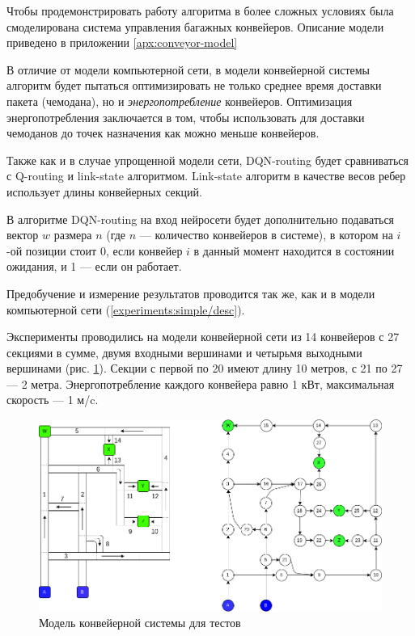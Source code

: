\documentclass[specification, annotation]{itmo-student-thesis}
\begin{document}
Чтобы продемонстрировать работу алгоритма в более сложных условиях была
смоделирована система управления багажных конвейеров. Описание модели
приведено в приложении \ref{apx:conveyor-model}

В отличие от модели компьютерной сети, в модели конвейерной системы алгоритм
будет пытаться оптимизировать не только среднее время доставки пакета
(чемодана), но и \textit{энергопотребление} конвейеров. Оптимизация
энергопотребления заключается в том, чтобы использовать для доставки чемоданов
до точек назначения как можно меньше конвейеров.

Также как и в случае упрощенной модели сети, DQN-routing будет сравниваться с
Q-routing и link-state алгоритмом. Link-state алгоритм в качестве весов ребер
использует длины конвейерных секций. 

В алгоритме DQN-routing на вход нейросети будет дополнительно подаваться вектор
$w$ размера $n$ (где $n$ --- количество конвейеров в системе), в котором на $i$-ой
позиции стоит 0, если конвейер $i$ в данный момент находится в состоянии
ожидания, и 1 --- если он работает.

Предобучение и измерение результатов проводится так же, как и в модели
компьютерной сети (\ref{experiments:simple/desc}).

Эксперименты проводились на модели конвейерной сети из 14 конвейеров с 27
секциями в сумме, двумя входными вершинами и четырьмя выходными вершинами (рис.
\ref{test-conveyors}). Секции с первой по 20 имеют длину 10 метров, с 21 по 27 --- 2
метра. Энергопотребление каждого конвейера равно 1 кВт, максимальная
скорость --- 1 м/c.

\begin{figure}[!h]
  \caption{Модель конвейерной системы для тестов}\label{test-conveyors}
  \centering
  \includegraphics[scale=0.5]{test-conveyors}
\end{figure}
\end{document}
